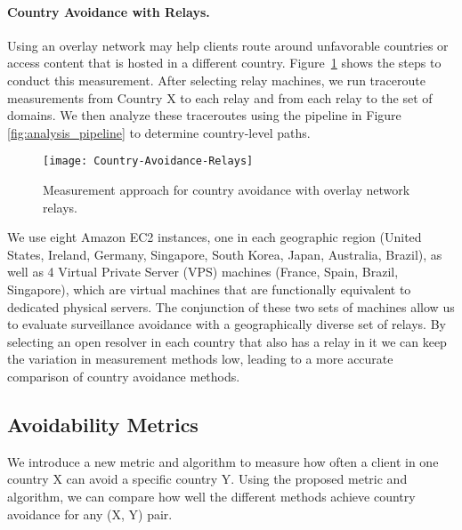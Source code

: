 \paragraph{Country Avoidance with Relays.} Using an overlay network may
help clients route around unfavorable countries or access content that
is hosted in a different country.  Figure~\ref{fig:avoidance_relays}
shows the steps to conduct this measurement. 
After selecting relay machines, we run traceroute measurements from
Country X to each relay and from each relay to the set of domains. We
then analyze these traceroutes using the pipeline in Figure
\ref{fig:analysis_pipeline} to determine country-level paths. 

\begin{figure}[t]
\centering
\texttt{[image: Country-Avoidance-Relays]}
\caption{Measurement approach for country avoidance with overlay network relays.}
\label{fig:avoidance_relays}
\end{figure}

We use eight Amazon EC2 instances, one in each geographic region (United States, Ireland, Germany, Singapore, South Korea, Japan, Australia, Brazil), as well as 4 Virtual Private Server (VPS) machines (France, Spain, Brazil, Singapore), which are virtual machines that are functionally equivalent to dedicated physical servers.  The conjunction of these two sets of machines allow us to evaluate surveillance avoidance with a geographically diverse set of relays. By selecting an open resolver in each country that also has a relay in it we can keep the variation in measurement methods low, leading to a more accurate comparison of country avoidance methods.

\subsection{Avoidability Metrics}
\label{metrics}

We introduce a new metric and algorithm to measure how often a client in
one country X can avoid a specific country Y.  Using the proposed metric
and algorithm, we can compare how well the different methods achieve
country avoidance for any (X, Y) pair.

